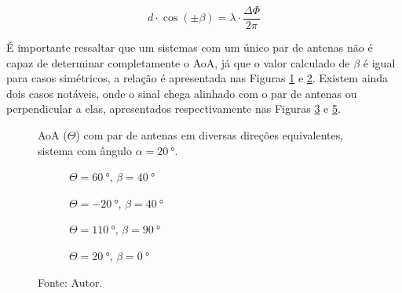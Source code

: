 \begin{equation} \label{eq:defasagem} %
    d \cdot \cos\left(\pm\beta\right) = \lambda \cdot \frac{\Delta\Phi}{2 \pi}
\end{equation}


É importante ressaltar que um sistemas com um único par de antenas não é capaz de determinar completamente o \ac{AoA}, já que o valor calculado de $\beta$ é igual para casos simétricos, a relação é apresentada nas Figuras \ref{fig:AoA:1} e \ref{fig:AoA:2}.
Existem ainda dois casos notáveis, onde o sinal chega alinhado com o par de antenas ou perpendicular a elas, apresentados respectivamente nas Figuras \ref{fig:AoA:3} e \ref{fig:AoA:4}.

\begin{figure}
    \caption{\ac{AoA} ($\Theta$) com par de antenas em diversas direções equivalentes, sistema com ângulo $\alpha=\SI{20}{\degree}$.}
    \label{fig:AoA}

    \hfill
    \begin{subfigure}[b]{0.45\textwidth}
        \centering
        \caption{$\Theta=\SI{60}{\degree}$, $\beta=\SI{40}{\degree}$}
        
        \label{fig:AoA:1}
    \end{subfigure}
    \hfill
    \begin{subfigure}[b]{0.45\textwidth}
        \centering
        \caption{$\Theta=\SI{-20}{\degree}$, $\beta=\SI{40}{\degree}$}
        
        \label{fig:AoA:2}
    \end{subfigure}
    \hfill

    \vspace{\floatsep}

    \hfill
    \begin{subfigure}[b]{0.45\textwidth}
        \centering
        \caption{$\Theta=\SI{110}{\degree}$, $\beta=\SI{90}{\degree}$}
        
        \label{fig:AoA:3}
    \end{subfigure}
    \hfill
    \begin{subfigure}[b]{0.45\textwidth}
        \centering
        \caption{$\Theta=\SI{20}{\degree}$, $\beta=\SI{0}{\degree}$}
        
        \label{fig:AoA:4}
    \end{subfigure}
    \hfill

    \caption*{Fonte: Autor.}
\end{figure}

